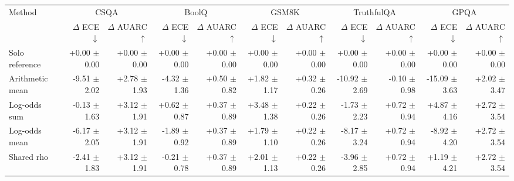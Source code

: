 \begin{tabular}{lrrrrrrrrrr}
\toprule
Method & \multicolumn{2}{c}{CSQA} & \multicolumn{2}{c}{BoolQ} & \multicolumn{2}{c}{GSM8K} & \multicolumn{2}{c}{TruthfulQA} & \multicolumn{2}{c}{GPQA} \\
 & $\Delta$ ECE $\downarrow$ & $\Delta$ AUARC $\uparrow$ & $\Delta$ ECE $\downarrow$ & $\Delta$ AUARC $\uparrow$ & $\Delta$ ECE $\downarrow$ & $\Delta$ AUARC $\uparrow$ & $\Delta$ ECE $\downarrow$ & $\Delta$ AUARC $\uparrow$ & $\Delta$ ECE $\downarrow$ & $\Delta$ AUARC $\uparrow$ \\
\midrule
Solo reference & +0.00 {\scriptsize $\pm$ 0.00} & +0.00 {\scriptsize $\pm$ 0.00} & +0.00 {\scriptsize $\pm$ 0.00} & +0.00 {\scriptsize $\pm$ 0.00} & +0.00 {\scriptsize $\pm$ 0.00} & +0.00 {\scriptsize $\pm$ 0.00} & +0.00 {\scriptsize $\pm$ 0.00} & +0.00 {\scriptsize $\pm$ 0.00} & +0.00 {\scriptsize $\pm$ 0.00} & +0.00 {\scriptsize $\pm$ 0.00} \\
Arithmetic mean & -9.51 {\scriptsize $\pm$ 2.02} & +2.78 {\scriptsize $\pm$ 1.93} & -4.32 {\scriptsize $\pm$ 1.36} & +0.50 {\scriptsize $\pm$ 0.82} & +1.82 {\scriptsize $\pm$ 1.17} & +0.32 {\scriptsize $\pm$ 0.26} & -10.92 {\scriptsize $\pm$ 2.69} & -0.10 {\scriptsize $\pm$ 0.98} & -15.09 {\scriptsize $\pm$ 3.63} & +2.02 {\scriptsize $\pm$ 3.47} \\
Log-odds sum & -0.13 {\scriptsize $\pm$ 1.63} & +3.12 {\scriptsize $\pm$ 1.91} & +0.62 {\scriptsize $\pm$ 0.87} & +0.37 {\scriptsize $\pm$ 0.89} & +3.48 {\scriptsize $\pm$ 1.38} & +0.22 {\scriptsize $\pm$ 0.26} & -1.73 {\scriptsize $\pm$ 2.23} & +0.72 {\scriptsize $\pm$ 0.94} & +4.87 {\scriptsize $\pm$ 4.16} & +2.72 {\scriptsize $\pm$ 3.54} \\
Log-odds mean & -6.17 {\scriptsize $\pm$ 2.05} & +3.12 {\scriptsize $\pm$ 1.91} & -1.89 {\scriptsize $\pm$ 0.92} & +0.37 {\scriptsize $\pm$ 0.89} & +1.79 {\scriptsize $\pm$ 1.10} & +0.22 {\scriptsize $\pm$ 0.26} & -8.17 {\scriptsize $\pm$ 3.24} & +0.72 {\scriptsize $\pm$ 0.94} & -8.92 {\scriptsize $\pm$ 4.20} & +2.72 {\scriptsize $\pm$ 3.54} \\
Shared rho & -2.41 {\scriptsize $\pm$ 1.83} & +3.12 {\scriptsize $\pm$ 1.91} & -0.21 {\scriptsize $\pm$ 0.78} & +0.37 {\scriptsize $\pm$ 0.89} & +2.01 {\scriptsize $\pm$ 1.13} & +0.22 {\scriptsize $\pm$ 0.26} & -3.96 {\scriptsize $\pm$ 2.85} & +0.72 {\scriptsize $\pm$ 0.94} & +1.19 {\scriptsize $\pm$ 4.21} & +2.72 {\scriptsize $\pm$ 3.54} \\

\end{tabular}
